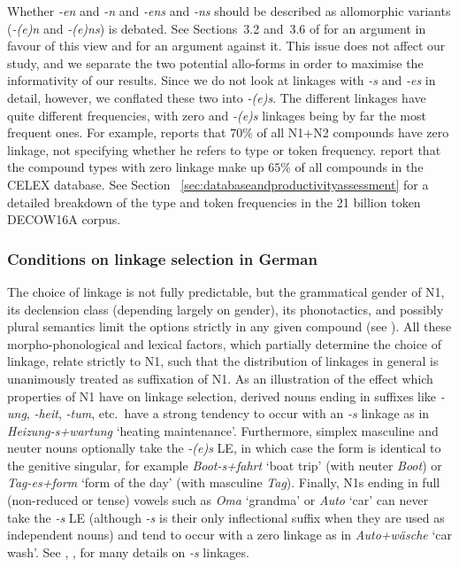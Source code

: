 Whether \textit{-en} and \textit{-n} and \textit{-ens} and \textit{-ns} should be described as allomorphic variants (\ie \textit{-(e)n} and \textit{-(e)ns}) is debated.
See Sections~3.2 and~3.6 of \textcite{NueblingSzczepaniak2013} for an argument in favour of this view and \textcite[33--36]{Neef2015} for an argument against it.
This issue does not affect our study, and we separate the two potential allo-forms in order to maximise the informativity of our results.
Since we do not look at linkages with \textit{-s} and \textit{-es} in detail, however, we conflated these two into \textit{-(e)s}.
The different linkages have quite different frequencies, with zero and \textit{-(e)s} linkages being by far the most frequent ones.
For example, \textcite[177]{Gallmann1998} reports that $70\%$ of all N1+N2 compounds have zero linkage, not specifying whether he refers to type or token frequency.
\textcite[29]{KrottEa2007} report that the compound types with zero linkage make up $65\%$ of all compounds in the CELEX database.
See Section~ \ref{sec:databaseandproductivityassessment} for a detailed breakdown of the type and token frequencies in the 21 billion token DECOW16A corpus.

\subsubsection{Conditions on linkage selection in German}
\label{sec:conditionsonlinkageselectioningerman}

The choice of linkage is not fully predictable, but the grammatical gender of N1, its declension class (depending largely on gender), its phonotactics, and possibly plural semantics limit the options strictly in any given compound (see \citealt{Fuhrhop1996,NueblingSzczepaniak2013}).
All these morpho-phono\-logical and lexical factors, which partially determine the choice of linkage, relate strictly to N1, such that the distribution of linkages in general is unanimously treated as suffixation of N1.
As an illustration of the effect which properties of N1 have on linkage selection, derived nouns ending in suffixes like \textit{-ung}, \textit{-heit}, \textit{-tum}, etc.\ have a strong tendency to occur with an \textit{-s} linkage as in \textit{Heizung-s+wartung} `heating maintenance'.
Furthermore, simplex masculine and neuter nouns optionally take the \textit{-(e)s} LE, in which case the form is identical to the genitive singular, for example \textit{Boot-s+fahrt} `boat trip' (with neuter \textit{Boot}) or \textit{Tag-es+form} `form of the day' (with masculine \textit{Tag}).
Finally, N1s ending in full (non-reduced or tense) vowels such as \textit{Oma} `grandma' or \textit{Auto} `car' can never take the \textit{-s} LE (although \textit{-s} is their only inflectional suffix when they are used as independent nouns) and tend to occur with a zero linkage as in \textit{Auto+wäsche} `car wash'.
See \textcite{Wegener2003}, \textcite{FuhrhopKuerschner2015}, \textcite{Fehringer2009} for many details on \textit{-s} linkages.

